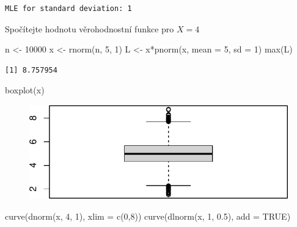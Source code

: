 \documentclass[
  letterpaper,
  DIV=11,
  numbers=noendperiod]{scrreprt}
\newenvironment{Shaded}{\begin{snugshade}}{\end{snugshade}}
\newcommand{\AttributeTok}[1]{\textcolor[rgb]{0.40,0.45,0.13}{#1}}
\newcommand{\ConstantTok}[1]{\textcolor[rgb]{0.56,0.35,0.01}{#1}}
\newcommand{\DecValTok}[1]{\textcolor[rgb]{0.68,0.00,0.00}{#1}}
\newcommand{\FloatTok}[1]{\textcolor[rgb]{0.68,0.00,0.00}{#1}}
\newcommand{\FunctionTok}[1]{\textcolor[rgb]{0.28,0.35,0.67}{#1}}
\newcommand{\NormalTok}[1]{\textcolor[rgb]{0.00,0.23,0.31}{#1}}
\newcommand{\OtherTok}[1]{\textcolor[rgb]{0.00,0.23,0.31}{#1}}
\newcommand{\SpecialCharTok}[1]{\textcolor[rgb]{0.37,0.37,0.37}{#1}}
\begin{document}
\begin{verbatim}
MLE for standard deviation: 1 
\end{verbatim}

Spočítejte hodnotu věrohodnostní funkce pro \(X = 4\)

\begin{Shaded}
\begin{Highlighting}[]
\NormalTok{n }\OtherTok{\textless{}{-}} \DecValTok{10000}
\NormalTok{x }\OtherTok{\textless{}{-}} \FunctionTok{rnorm}\NormalTok{(n, }\DecValTok{5}\NormalTok{, }\DecValTok{1}\NormalTok{)}
\NormalTok{L }\OtherTok{\textless{}{-}}\NormalTok{ x}\SpecialCharTok{*}\FunctionTok{pnorm}\NormalTok{(x, }\AttributeTok{mean =} \DecValTok{5}\NormalTok{, }\AttributeTok{sd =} \DecValTok{1}\NormalTok{)}
\FunctionTok{max}\NormalTok{(L)}
\end{Highlighting}
\end{Shaded}

\begin{verbatim}
[1] 8.757954
\end{verbatim}

\begin{Shaded}
\begin{Highlighting}[]
\FunctionTok{boxplot}\NormalTok{(x)}
\end{Highlighting}
\end{Shaded}

\begin{figure}[H]

{\centering \includegraphics{06_odhad_files/figure-pdf/unnamed-chunk-6-1.pdf}

}

\end{figure}

\begin{Shaded}
\begin{Highlighting}[]
\FunctionTok{curve}\NormalTok{(}\FunctionTok{dnorm}\NormalTok{(x, }\DecValTok{4}\NormalTok{, }\DecValTok{1}\NormalTok{), }\AttributeTok{xlim =} \FunctionTok{c}\NormalTok{(}\DecValTok{0}\NormalTok{,}\DecValTok{8}\NormalTok{))}
\FunctionTok{curve}\NormalTok{(}\FunctionTok{dlnorm}\NormalTok{(x, }\DecValTok{1}\NormalTok{, }\FloatTok{0.5}\NormalTok{), }\AttributeTok{add =} \ConstantTok{TRUE}\NormalTok{)}
\end{Highlighting}
\end{Shaded}
\end{document}
